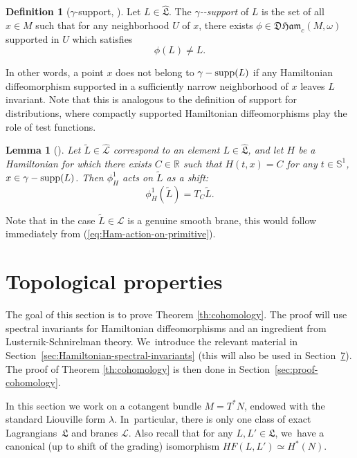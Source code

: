 \documentclass[10pt,a4paper]{amsart}
\providecommand{\nobreakdash}{\nobreak\hbox{-}}
\newtheorem{lem}[thm]{Lemma}
\theoremstyle{definition}
\newtheorem{defn}[thm]{Definition}
\newcommand {\LL}{{\mathcal L}}
\newcommand{\R}{\mathbb{R}}
\DeclareMathOperator{\gammasupp}{\gamma\textup{-supp}}
\newcommand{\DHam}{\mathfrak{DHam}}
\newcommand{\fL}{\mathfrak {L}}
\newcommand{\hatL}{\widehat{\fL}}
\newcommand{\hatLL}{\widehat{\LL}}
\begin{document}
\begin{defn}[$\gamma$-support, \cite{Viterbo-gammas}]\label{defgamma} Let $L\in \hatL$. The \emph{$\gamma$\nobreakdash-support} of $L$ is the set of all $x\in M$ such that for any neighborhood $U$ of $x$, there exists $\phi\in\DHam_c(M,\omega)$ supported in $U$ which satisfies
\[
\phi(L)\neq L.
\]
\end{defn}

In other words, a point $x$ does not belong to $\gammasupp(L)$ if any Hamiltonian diffeomorphism supported in a sufficiently narrow neighborhood of $x$ leaves $L$ invariant. Note that this is analogous to the definition of support for
distributions, where compactly supported Hamiltonian diffeomorphisms play the role of test functions.

\setcounter{thm}{14}
\begin{lem}[{\cite[Lem.\,6.12]{Viterbo-gammas}}]\label{lem:shift-of brane} Let $\tilde L\in \hatLL$ correspond to an element $L\in\hatL$, and let $H$ be a Hamiltonian for which there exists $C\in\R$ such that $H(t,x)=C$ for any $t\in\mathbb{S}^1$, $x\in \gammasupp(L)$. Then $\phi_H^1$ acts on $\tilde L$ as a shift:\vspace*{-3pt}
\[
\phi_H^1(\tilde L)=T_C\tilde L.
\]
\end{lem}

Note that in the case $\tilde L\in\LL$ is a genuine smooth brane, this would follow immediately from (\ref{eq:Ham-action-on-primitive}).

\setcounter{section}{5}
\section{Topological properties}\label{sec:topological-properties}

The goal of this section is to prove Theorem \ref{th:cohomology}. The proof will use spectral invariants for Hamiltonian diffeomorphisms and an ingredient from Lusternik-Schnirelman theory. We~introduce the relevant material in Section~\ref{sec:Hamiltonian-spectral-invariants} (this will also be used in Section~\href{https://jep.centre-mersenne.org/articles/10.5802/jep.336/}{7}). The proof of Theorem \ref{th:cohomology} is then done in Section~\ref{sec:proof-cohomology}.

In this section we work on a cotangent bundle $M=T^*N$, endowed with the standard Liouville form $\lambda$. In~particular, there is only one class of exact Lagrangians~$\fL$ and branes $\LL$. Also recall that for any $L, L'\in\fL$, we~have a canonical (up to shift of the grading) isomorphism $HF(L,L')\simeq H^*(N)$.
\end{document}
